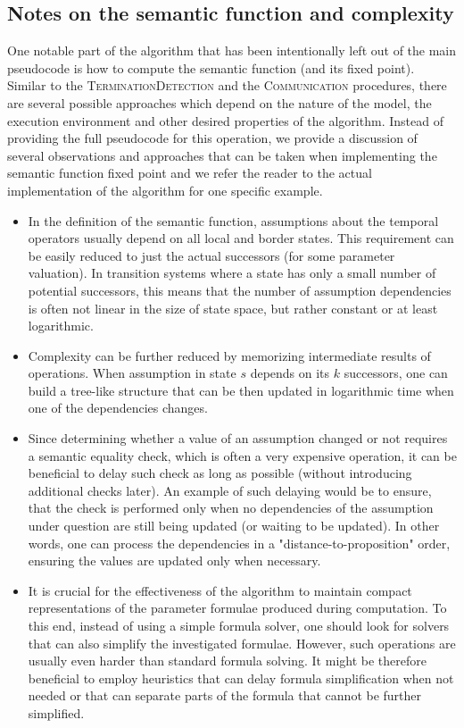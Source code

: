 \subsection{Notes on the semantic function and complexity}

One notable part of the algorithm that has been intentionally left out of the main pseudocode is how to compute the semantic function (and its fixed point). Similar to the \textsc{TerminationDetection} and the \textsc{Communication} procedures, there are several possible approaches which depend on the nature of the model, the execution environment and other desired properties of the algorithm.  Instead of providing the full pseudocode for this operation, we provide a discussion of several observations and approaches that can be taken when implementing the semantic function fixed point and we refer the reader to the actual implementation of the algorithm for one specific example.

\begin{itemize}
	\item In the definition of the semantic function, assumptions about the temporal operators usually depend on all local and border states. This requirement can be easily reduced to just the actual successors (for some parameter valuation). In transition systems where a state has only a small number of potential successors, this means that the number of assumption dependencies is often not linear in the size of state space, but rather constant or at least logarithmic.
	\item Complexity can be further reduced by memorizing intermediate results of operations. When assumption in state $s$ depends on its $k$ successors, one can build a tree-like structure that can be then updated in logarithmic time when one of the dependencies changes.
	\item Since determining whether a value of an assumption changed or not requires a semantic equality check, which is often a very expensive operation, it can be beneficial to delay such check as long as possible (without introducing additional checks later). An example of such delaying would be to ensure, that the check is performed only when no dependencies of the assumption under question are still being updated (or waiting to be updated). In other words, one can process the dependencies in a "distance-to-proposition" order, ensuring the values are updated only when necessary.
	\item It is crucial for the effectiveness of the algorithm to maintain compact representations of the parameter formulae produced during computation. To this end, instead of using a simple formula solver, one should look for solvers that can also simplify the investigated formulae. However, such operations are usually even harder than standard formula solving. It might be therefore beneficial to employ heuristics that can delay formula simplification when not needed or that can separate parts of the formula that cannot be further simplified.
\end{itemize}

